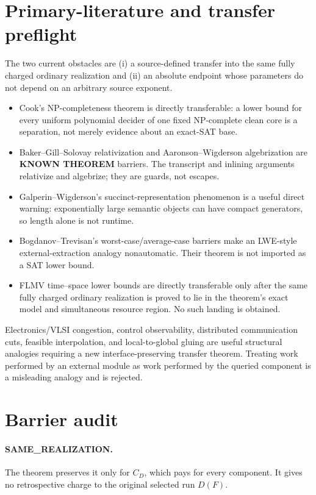 \documentclass[11pt]{article}
\newcommand{\KNOWN}{\textbf{KNOWN THEOREM}}
\begin{document}
\section{Primary-literature and transfer preflight}
The two current obstacles are (i) a source-defined transfer into the same
fully charged ordinary realization and (ii) an absolute endpoint whose
parameters do not depend on an arbitrary source exponent.
\begin{itemize}[leftmargin=*]
\item Cook's NP-completeness theorem is directly transferable: a lower bound
for every uniform polynomial decider of one fixed NP-complete clean core is a
separation, not merely evidence about an exact-SAT base.
\item Baker--Gill--Solovay relativization and Aaronson--Wigderson
algebrization are \KNOWN{} barriers.  The transcript and inlining arguments
relativize and algebrize; they are guards, not escapes.
\item Galperin--Wigderson's succinct-representation phenomenon is a useful
direct warning: exponentially large semantic objects can have compact
generators, so length alone is not runtime.
\item Bogdanov--Trevisan's worst-case/average-case barriers make an LWE-style
external-extraction analogy nonautomatic.  Their theorem is not imported as
a SAT lower bound.
\item FLMV time--space lower bounds are directly transferable only after the
same fully charged ordinary realization is proved to lie in the theorem's
exact model and simultaneous resource region.  No such landing is obtained.
\end{itemize}

Electronics/VLSI congestion, control observability, distributed
communication cuts, feasible interpolation, and local-to-global gluing are
useful structural analogies requiring a new interface-preserving transfer
theorem.  Treating work performed by an external module as work performed by
the queried component is a misleading analogy and is rejected.

\section{Barrier audit}
\paragraph{SAME\_REALIZATION.}
The theorem preserves it only for \(C_D\), which pays for every component.
It gives no retrospective charge to the original selected run \(D(F)\).
\end{document}
